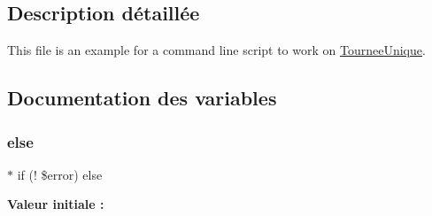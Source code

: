 \subsection{Description détaillée}
This file is an example for a command line script to work on \hyperlink{classTourneeUnique}{Tournee\+Unique}. 



\subsection{Documentation des variables}
\mbox{\label{scripts_2tourneeunique_8php_a7b6906d90f668055f3c8e8b2ae497513}} 
\subsubsection{\texorpdfstring{else}{else}}
{\footnotesize\ttfamily $\ast$ if (! \$error) else}

{\bfseries Valeur initiale \+:}
